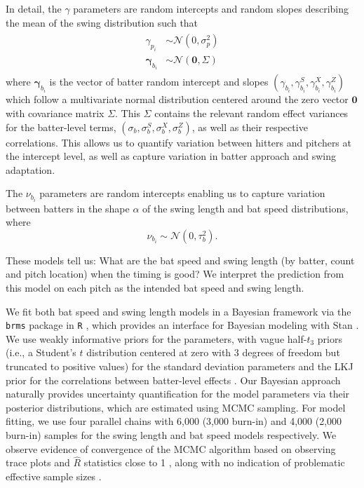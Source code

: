 \documentclass{article}
\begin{document}
    In detail, the $\gamma$ parameters are random intercepts and random slopes describing the mean of the swing distribution such that
    \begin{align}
        \begin{split}
            \gamma_{p_i} &\sim \mathcal{N}(0, \sigma^2_p) \\
            \boldsymbol{\gamma}_{b_i} &\sim \mathcal{N}(\boldsymbol{0}, \Sigma)
        \end{split}
    \end{align}
    where $\boldsymbol{\gamma}_{b_i}$ is the vector of batter random intercept and slopes $(\gamma_{b_i}, \gamma^S_{b_i}, \gamma^X_{b_i}, \gamma^Z_{b_i})$ which follow a multivariate normal distribution centered around the zero vector $\boldsymbol{0}$ with covariance matrix $\Sigma$. This $\Sigma$ contains the relevant random effect variances for the batter-level terms, $(\sigma_b, \sigma_b^S, \sigma_b^X, \sigma_b^Z)$, as well as their respective correlations. This allows us to quantify variation between hitters and pitchers at the intercept level, as well as capture variation in batter approach and swing adaptation.
    
    The $\nu_{b_i}$ parameters are random intercepts enabling us to capture variation between batters in the shape $\alpha$ of the swing length and bat speed distributions, where
    \begin{equation}
        \nu_{b_i} \sim \mathcal{N}(0, \tau^2_b).
    \end{equation}

    These models tell us: What are the bat speed and swing length (by batter, count and pitch location) when the timing is good? We interpret the prediction from this model on each pitch as the intended bat speed and swing length.
    
    We fit both bat speed and swing length models in a Bayesian framework via the \texttt{brms} package in \texttt{R} \citep{brms}, which provides an interface for Bayesian modeling with Stan \citep{carpenter2017stan}. We use weakly informative priors for the parameters, with vague half-$t_3$ priors (i.e., a Student's $t$ distribution centered at zero with 3 degrees of freedom but truncated to positive values) for the standard deviation parameters \citep{gelman2006prior} and the LKJ prior for the correlations between batter-level effects \citep{lewandowski2009generating}. Our Bayesian approach naturally provides uncertainty quantification for the model parameters via their posterior distributions, which are estimated using MCMC sampling. For model fitting, we use four parallel chains with 6,000 (3,000 burn-in) and 4,000 (2,000 burn-in) samples for the swing length and bat speed models respectively. We observe evidence of convergence of the MCMC algorithm based on observing trace plots and $\hat{R}$ statistics close to 1 \citep{gelman1992inference, brooks1998general}, along with no indication of problematic effective sample sizes \citep{gelman2020bayesian}. 
    
\end{document}
